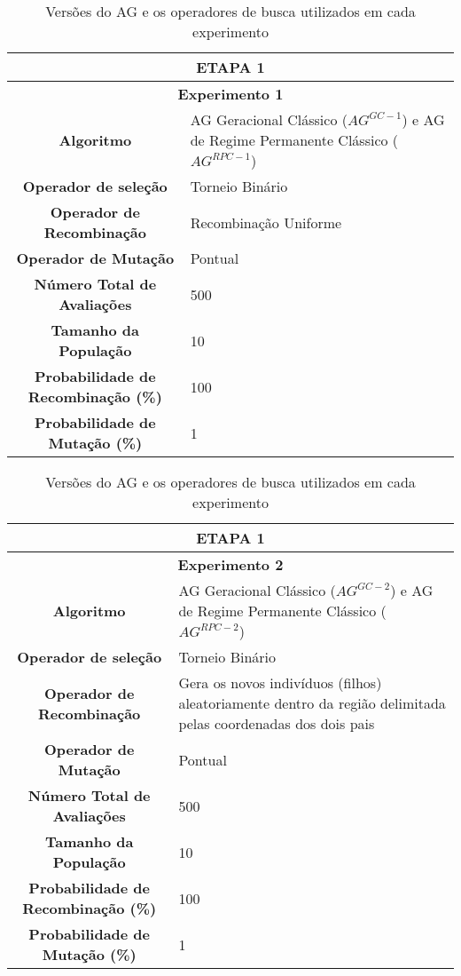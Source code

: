 \begin{table}[H]
\centering
\caption{Versões do AG e os operadores de busca utilizados em cada experimento}

\begin{tabular}{|c|p{9cm}|}
\hline
 \multicolumn{2}{|c|}{ETAPA 1} \\ \hline
 \multicolumn{2}{|c|}{\textbf{Experimento 1}} \\ \hline
 {\textbf{Algoritmo}} & AG Geracional Clássico ($AG^{GC-1}$) e AG de Regime Permanente Clássico ($AG^{RPC-1}$) \\ \hline
 \textbf{Operador de seleção} & Torneio Binário \\ \hline
 \textbf{Operador de Recombinação} & Recombinação Uniforme \\  \hline
 \textbf{Operador de Mutação} & Pontual \\ \hline
 \textbf{Número Total de Avaliações} & 500 \\ \hline
 \textbf{Tamanho da População} & 10 \\ \hline
 \textbf{Probabilidade de Recombinação (\%)} & 100 \\ \hline
 \textbf{Probabilidade de Mutação (\%)} & 1 \\ \hline 
\end{tabular}
\end{table}

\begin{table}[H]
\centering
\caption{Versões do AG e os operadores de busca utilizados em cada experimento}

\begin{tabular}{|c|p{9cm}|}
 \hline
 \multicolumn{2}{|c|}{ETAPA 1} \\ \hline
 \multicolumn{2}{|c|}{\textbf{Experimento 2}} \\ \hline
{\textbf{Algoritmo}} & AG Geracional Clássico ($AG^{GC-2}$) e AG de Regime Permanente Clássico ($AG^{RPC-2}$) \\ \hline
 \textbf{Operador de seleção} & Torneio Binário \\ \hline
 \textbf{Operador de Recombinação} & Gera os novos indivíduos (filhos) aleatoriamente dentro da região delimitada pelas coordenadas dos dois pais \\  \hline
 \textbf{Operador de Mutação} & Pontual \\ \hline
 \textbf{Número Total de Avaliações} & 500 \\ \hline
 \textbf{Tamanho da População} & 10 \\ \hline
 \textbf{Probabilidade de Recombinação (\%)} & 100 \\ \hline
 \textbf{Probabilidade de Mutação (\%)} & 1 \\ \hline 
 
\end{tabular}
\end{table} 

